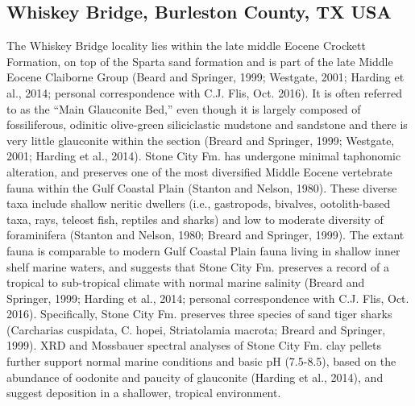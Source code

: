 \documentclass[]{rsos}%
\begin{document}
\subsection{Whiskey Bridge, Burleston County, TX USA}

The Whiskey Bridge locality lies within the late middle Eocene Crockett Formation, on top of the Sparta sand formation and is part of the late Middle Eocene Claiborne Group (Beard and Springer, 1999; Westgate, 2001; Harding et al., 2014; personal correspondence with C.J. Flis, Oct. 2016). 
It is often referred to as the “Main Glauconite Bed,” even though it is largely composed of fossiliferous, odinitic olive-green siliciclastic mudstone and sandstone and there is very little glauconite within the section (Breard and Springer, 1999; Westgate, 2001; Harding et al., 2014). 
Stone City Fm. has undergone minimal taphonomic alteration, and preserves one of the most diversified Middle Eocene vertebrate fauna within the Gulf Coastal Plain (Stanton and Nelson, 1980).
These diverse taxa include shallow neritic dwellers (i.e., gastropods, bivalves, ootolith-based taxa, rays, teleost fish, reptiles and sharks) and low to moderate diversity of foraminifera (Stanton and Nelson, 1980; Breard and Springer, 1999). 
The extant fauna is comparable to modern Gulf Coastal Plain fauna living in shallow inner shelf marine waters, and suggests that Stone City Fm. preserves a record of a tropical to sub-tropical climate with normal marine salinity (Breard and Springer, 1999; Harding et al., 2014; personal correspondence with C.J. Flis, Oct. 2016). 
Specifically, Stone City Fm. preserves three species of sand tiger sharks (Carcharias cuspidata, C. hopei, Striatolamia macrota; Breard and Springer, 1999). 
XRD and Mossbauer spectral analyses of Stone City Fm. clay pellets further support normal marine conditions and basic pH (7.5-8.5), based on the abundance of oodonite and paucity of glauconite (Harding et al., 2014), and suggest deposition in a shallower, tropical environment.
\end{document}
